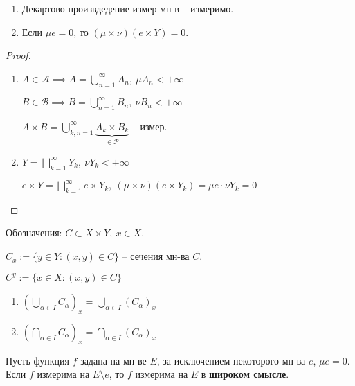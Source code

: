 \begin{consequence}
    \begin{enumerate}
        \item Декартово произвдедение измер мн-в -- измеримо.
        \item Если $\mu e = 0$, то $(\mu \times \nu)(e \times Y) = 0$.
    \end{enumerate}
\end{consequence}
\begin{proof}
    \begin{enumerate}
        \item {
            $A \in \mathcal{A} \implies A = \bigcup_{n=1}^{\infty} A_n, \ \mu A_n < +\infty$

            $B \in \mathcal{B} \implies B = \bigcup_{n=1}^{\infty} B_n, \ \nu B_n < +\infty$

            $A \times B = \bigcup_{k, n = 1}^{\infty} \underbrace{A_k \times B_k}_{\in \mathcal{P}}$ -- измер.
        }
        \item {
            $Y = \bigsqcup_{k=1}^{\infty} Y_k, \ \nu Y_k < +\infty$

            $e \times Y = \bigsqcup_{k=1}^{\infty} e \times Y_k, \ (\mu \times \nu) (e \times Y_k) = \mu e \cdot \nu Y_k = 0$
        }
    \end{enumerate}
\end{proof}

\begin{remark}
    Обозначения: $C \subset X \times Y, \ x \in X$.

    $C_x := \{ y \in Y: (x, y) \in C \}$ -- сечения мн-ва $C$.

    $C^y := \{ x \in X: (x, y) \in C \}$

\end{remark} 
\begin{consequence}
    \begin{enumerate}
        \item {
            $\left(\bigcup_{\alpha \in I} C_{\alpha}\right)_x = \bigcup_{\alpha \in I} (C_{\alpha})_x$
        }
        \item {
            $\left( \bigcap_{\alpha \in I} C_{\alpha} \right)_x = \bigcap_{\alpha \in I} (C_{\alpha})_x$
        }
    \end{enumerate}
\end{consequence}

\begin{definition}
    Пусть функция $f$ задана на мн-ве $E$, за исключением некоторого мн-ва $e$, $\mu e  = 0$. Если $f$ измерима на $E \setminus e$, то $f$ измерима на $E$ в \textbf{широком смысле}.
\end{definition}

